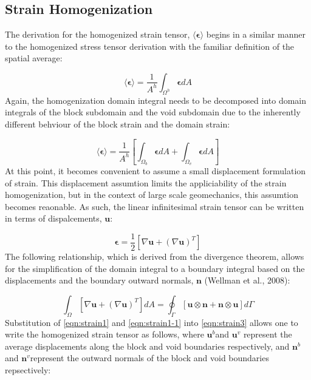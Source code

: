 \subsection{Strain Homogenization}

The derivation for the homogenized strain tensor, $\langle\boldsymbol{\epsilon}\rangle$
begins in a similar manner to the homogenized stress tensor derivation
with the familiar definition of the spatial average:

\begin{equation}
\langle\boldsymbol{\epsilon}\rangle=\frac{1}{A^{h}}\int_{\Omega^{h}}\boldsymbol{\epsilon}dA\label{eqn:strain2}
\end{equation}
Again, the homogenization domain integral needs to be decomposed into
domain integrals of the block subdomain and the void subdomain due
to the inherently different behviour of the block strain and the domain
strain:

\begin{equation}
\langle\boldsymbol{\epsilon}\rangle=\frac{1}{A^{h}}\left[\int_{\Omega_{b}}\boldsymbol{\epsilon}dA+\int_{\Omega_{v}}\boldsymbol{\epsilon}dA\right]\label{eqn:strain3}
\end{equation}
At this point, it becomes convenient to assume a small displacement
formulation of strain. This displacement assumtion limits the appliciability
of the strain homogenization, but in the context of large scale geomechanics,
this assumtion becomes reaonable. As such, the linear infinitesimal
strain tensor can be written in terms of dispalcements, $\mathbf{u}$:

\begin{equation}
\boldsymbol{\epsilon}=\frac{1}{2}\left[\nabla\mathbf{u}+\left(\nabla\mathbf{u}\right)^{T}\right]\label{eqn:strain1}
\end{equation}
The following relationship, which is derived from the divergence theorem,
allows for the simplification of the domain integral to a boundary
integral based on the displacements and the boundary outward normals,
$\mathbf{n}$ (Wellman et al., 2008):

\begin{equation}
\int_{\Omega}\left[\nabla\mathbf{u}+\left(\nabla\mathbf{u}\right)^{T}\right]dA=\oint_{\Gamma}\left[\mathbf{u}\otimes\mathbf{n}+\mathbf{n}\otimes\mathbf{u}\right]d\Gamma\label{eqn:strain1-1}
\end{equation}
Substitution of \ref{eqn:strain1} and \ref{eqn:strain1-1} into \ref{eqn:strain3}
allows one to write the homogenized strain tensor as follows, where
$\mathbf{u}^{b}$and $\mathbf{u}^{v}$ represent the average displacements
along the block and void boundaries respectively, and $\mathbf{n}^{b}$and
$\mathbf{n}^{v}$represent the outward normals of the block and void
boundaries repsectively:

